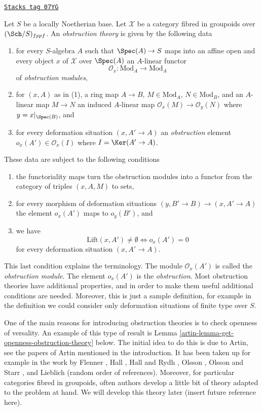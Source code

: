 \begin{definition}
\label{artin-definition-obstruction-theory}
\href{https://stacks.math.columbia.edu/tag/07YG}{\texttt{Stacks tag 07YG}}

Let $S$ be a locally Noetherian base. Let $\mathcal{X}$ be a category fibred
in groupoids over $(\Sch/S)_{fppf}$. An {\it obstruction theory} is
given by the following data
\begin{enumerate}
\item for every $S$-algebra $A$ such that $\Spec(A) \to S$
maps into an affine open and every object $x$ of $\mathcal{X}$ over
$\Spec(A)$ an $A$-linear functor
$$
\mathcal{O}_x : \text{Mod}_A \to \text{Mod}_A
$$
of {\it obstruction modules},
\item for $(x, A)$ as in (1), a ring map $A \to B$,
$M \in \text{Mod}_A$, $N \in \text{Mod}_B$, and an $A$-linear
map $M \to N$ an induced $A$-linear map $\mathcal{O}_x(M) \to \mathcal{O}_y(N)$
where $y = x|_{\Spec(B)}$, and
\item for every deformation situation $(x, A' \to A)$ an
{\it obstruction} element
$o_x(A') \in \mathcal{O}_x(I)$ where $I = \Ker(A' \to A)$.
\end{enumerate}
These data are subject to the following conditions
\begin{enumerate}
\item[(i)] the functoriality maps turn the obstruction modules into a functor
from the category of triples $(x, A, M)$ to sets,
\item[(ii)] for every morphism of deformation situations
$(y, B' \to B) \to (x, A' \to A)$ the element $o_x(A')$ maps
to $o_y(B')$, and
\item[(iii)] we have
$$
\text{Lift}(x, A') \not = \emptyset
\Leftrightarrow
o_x(A') = 0
$$
for every deformation situation $(x, A' \to A)$.
\end{enumerate}
\end{definition}

This last condition explains the terminology. The module $\mathcal{O}_x(A')$
is called the {\it obstruction module}. The element $o_x(A')$ is the
{\it obstruction}.
Most obstruction theories have additional properties, and in order to
make them useful additional conditions are needed.
Moreover, this is just a sample definition, for example in the definition
we could consider only deformation situations of finite type over $S$.

\medskip\noindent
One of the main reasons for introducing obstruction theories is to check
openness of versality. An example of this type of result is
Lemma \ref{artin-lemma-get-openness-obstruction-theory} below.
The initial idea to do this is due to Artin, see
the papers of Artin mentioned in the introduction. It has been taken up
for example in the work by Flenner \cite{Flenner},
Hall \cite{Hall-coherent},
Hall and Rydh \cite{rydh_axioms},
Olsson \cite{olsson_deformation},
Olsson and Starr \cite{olsson-starr}, and
Lieblich \cite{lieblich-complexes} (random order of references).
Moreover, for particular categories fibred in groupoids, often
authors develop a little bit of theory adapted to the problem at hand.
We will develop this theory later (insert future reference here).

